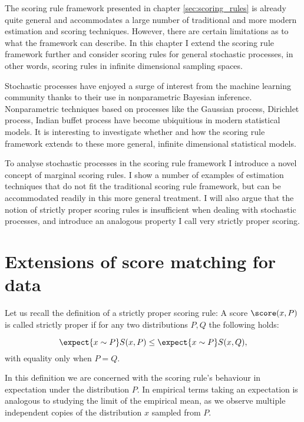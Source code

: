 The scoring rule framework presented in chapter \ref{sec:scoring_rules} is already quite general and accommodates a large number of traditional and more modern estimation and scoring techniques. However, there are certain limitations as to what the framework can describe. In this chapter I extend the scoring rule framework further and consider scoring rules for general stochastic processes, in other words, scoring rules in infinite dimensional sampling spaces.

Stochastic processes have enjoyed a surge of interest from the machine learning community thanks to their use in nonparametric Bayesian inference. Nonparametric techniques based on processes like the Gaussian process, Dirichlet process, Indian buffet process have become ubiquitious in modern statistical models. It is interesting to investigate whether and how the scoring rule framework extends to these more general, infinite dimensional statistical models.

To analyse stochastic processes in the scoring rule framework I introduce a novel concept of marginal scoring rules. I show a number of examples of estimation techniques that do not fit the traditional scoring rule framework, but can be accommodated readily in this more general treatment. I will also argue that the notion of strictly proper scoring rules is insufficient when dealing with stochastic processes, and introduce an analogous property I call very strictly proper scoring. 

\section{Extensions of score matching for \iid data}

Let us recall the definition of a strictly proper scoring rule: A score $\score(x,P)$ is called strictly proper if for any two distributions $P,Q$ the following holds:

\begin{equation}
	\expect{x\sim P}S(x,P) \leq \expect{x\sim P}S(x,Q),
\end{equation}
with equality only when $P=Q$.

In this definition we are concerned with the scoring rule's behaviour in expectation under the distribution $P$. In empirical terms taking an expectation is analogous to studying the limit of the empirical mean, as we observe multiple independent copies of the distribution $x$ sampled from $P$.

